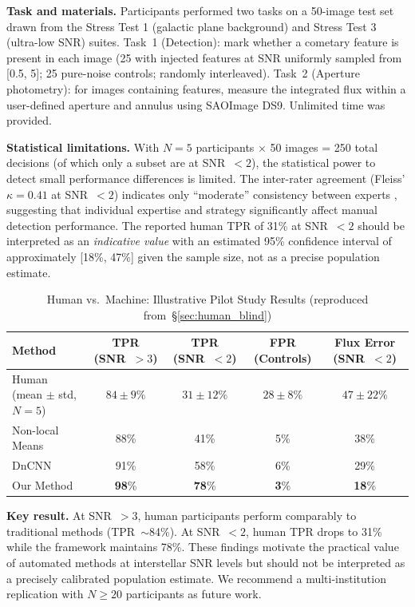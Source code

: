 \documentclass[usenatbib]{mnras}
\newcommand{\tablecomments}[1]{\vspace{4pt}{\footnotesize #1}\vspace{2pt}}
\begin{document}
\textbf{Task and materials.} Participants performed two tasks on a 50-image test set drawn from the Stress Test 1 (galactic plane background) and Stress Test 3 (ultra-low SNR) suites. Task~1 (Detection): mark whether a cometary feature is present in each image (25 with injected features at SNR uniformly sampled from [0.5, 5]; 25 pure-noise controls; randomly interleaved). Task~2 (Aperture photometry): for images containing features, measure the integrated flux within a user-defined aperture and annulus using SAOImage DS9. Unlimited time was provided.

\textbf{Statistical limitations.} With $N=5$ participants $\times$ 50 images = 250 total decisions (of which only a subset are at SNR~$<2$), the statistical power to detect small performance differences is limited. The inter-rater agreement (Fleiss' $\kappa = 0.41$ at SNR~$<2$) indicates only ``moderate'' consistency between experts \citep{landis77}, suggesting that individual expertise and strategy significantly affect manual detection performance. The reported human TPR of 31\% at SNR~$<2$ should be interpreted as an \textit{indicative value} with an estimated 95\% confidence interval of approximately [18\%, 47\%] given the sample size, not as a precise population estimate.

\begin{table}
\centering
\caption{Human vs.\ Machine: Illustrative Pilot Study Results (reproduced from~\S\ref{sec:human_blind})}\label{tab:human_vs_ai_app}
\begin{tabular}{lcccc}
\toprule
Method & TPR (SNR~$>3$) & TPR (SNR~$<2$) & FPR (Controls) & Flux Error (SNR~$<2$) \\
\midrule
Human (mean $\pm$ std, $N=5$) & $84 \pm 9\%$ & $31 \pm 12\%$ & $28 \pm 8\%$ & $47 \pm 22\%$ \\
Non-local Means & 88\% & 41\% & 5\% & 38\% \\
DnCNN \citep{zhang17} & 91\% & 58\% & 6\% & 29\% \\
Our Method & \textbf{98}\% & \textbf{78}\% & \textbf{3}\% & \textbf{18}\% \\
\bottomrule
\end{tabular}
\tablecomments{Human participants ($N=5$): convenience sample. Values are mean $\pm$ standard deviation across participants. The human TPR at SNR $<2$ has an estimated 95\% CI of [18\%, 47\%]. Fleiss' $\kappa = 0.41$ at SNR $<2$.}
\end{table}

\textbf{Key result.} At SNR~$>3$, human participants perform comparably to traditional methods (TPR~$\sim$84\%). At SNR~$<2$, human TPR drops to 31\% while the framework maintains 78\%. These findings motivate the practical value of automated methods at interstellar SNR levels but should not be interpreted as a precisely calibrated population estimate. We recommend a multi-institution replication with $N \geq 20$ participants as future work.
\end{document}
